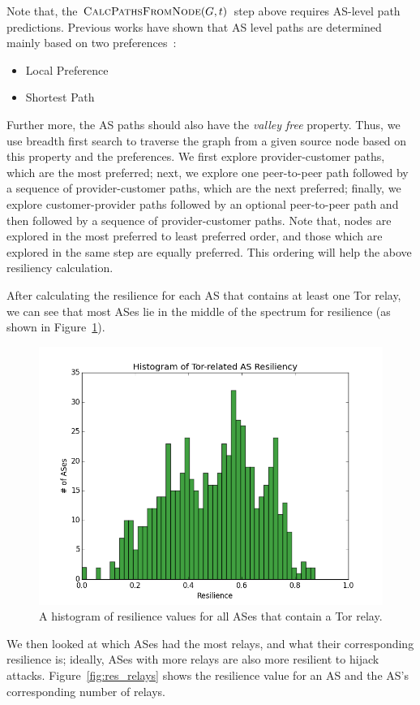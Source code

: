 Note that, the $\Call{CalcPathsFromNode}{G,t}$ step above requires AS-level path predictions. Previous works have shown that AS level paths are determined mainly based on two preferences~\cite{starov2015measuring}:

\begin{itemize}
\item Local Preference
\item Shortest Path
\end{itemize}

Further more, the AS paths should also have the \emph{valley free} property. Thus, we use breadth first search to traverse the graph from a given source node based on this property and the preferences. We first explore provider-customer paths, which are the most preferred; next, we explore one peer-to-peer path followed by a sequence of provider-customer paths, which are the next preferred; finally, we explore customer-provider paths followed by an optional peer-to-peer path and then followed by a sequence of provider-customer paths. Note that, nodes are explored in the most preferred to least preferred order, and those which are explored in the same step are equally preferred. This ordering will help the above resiliency calculation. 

After calculating the resilience for each AS that contains at least one Tor relay, we can see that most ASes lie in the middle of the spectrum for resilience (as shown in Figure~\ref{fig:resilience_histogram}).

\begin{figure}
\centering
\includegraphics[width=.5\textwidth]{resilience_histogram}
\caption{A histogram of resilience values for all ASes that contain a Tor relay.}
\label{fig:resilience_histogram}
\end{figure}

We then looked at which ASes had the most relays, and what their corresponding resilience is; ideally, ASes with more relays are also more resilient to hijack attacks.  Figure~\ref{fig:res_relays} shows the resilience value for an AS and the AS's corresponding number of relays.  

